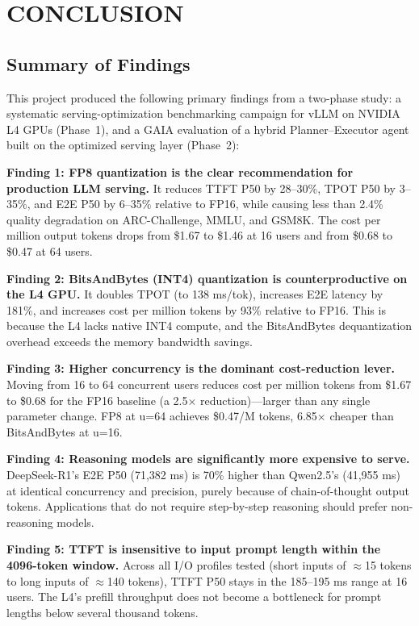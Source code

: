 \documentclass[a4paper,12pt]{report}
\begin{document}
\chapter{CONCLUSION}

\section{Summary of Findings}

This project produced the following primary findings from a two-phase study: a systematic serving-optimization benchmarking campaign for vLLM on NVIDIA L4 GPUs (Phase~1), and a GAIA evaluation of a hybrid Planner--Executor agent built on the optimized serving layer (Phase~2):

\textbf{Finding 1: FP8 quantization is the clear recommendation for production LLM serving.} It reduces TTFT P50 by 28--30\%, TPOT P50 by 3--35\%, and E2E P50 by 6--35\% relative to FP16, while causing less than 2.4\% quality degradation on ARC-Challenge, MMLU, and GSM8K. The cost per million output tokens drops from \$1.67 to \$1.46 at 16 users and from \$0.68 to \$0.47 at 64 users.

\textbf{Finding 2: BitsAndBytes (INT4) quantization is counterproductive on the L4 GPU.} It doubles TPOT (to 138 ms/tok), increases E2E latency by 181\%, and increases cost per million tokens by 93\% relative to FP16. This is because the L4 lacks native INT4 compute, and the BitsAndBytes dequantization overhead exceeds the memory bandwidth savings.

\textbf{Finding 3: Higher concurrency is the dominant cost-reduction lever.} Moving from 16 to 64 concurrent users reduces cost per million tokens from \$1.67 to \$0.68 for the FP16 baseline (a 2.5$\times$ reduction)---larger than any single parameter change. FP8 at u=64 achieves \$0.47/M tokens, 6.85$\times$ cheaper than BitsAndBytes at u=16.

\textbf{Finding 4: Reasoning models are significantly more expensive to serve.} DeepSeek-R1's E2E P50 (71{,}382 ms) is 70\% higher than Qwen2.5's (41{,}955 ms) at identical concurrency and precision, purely because of chain-of-thought output tokens. Applications that do not require step-by-step reasoning should prefer non-reasoning models.

\textbf{Finding 5: TTFT is insensitive to input prompt length within the 4096-token window.} Across all I/O profiles tested (short inputs of $\approx$15 tokens to long inputs of $\approx$140 tokens), TTFT P50 stays in the 185--195 ms range at 16 users. The L4's prefill throughput does not become a bottleneck for prompt lengths below several thousand tokens.
\end{document}
